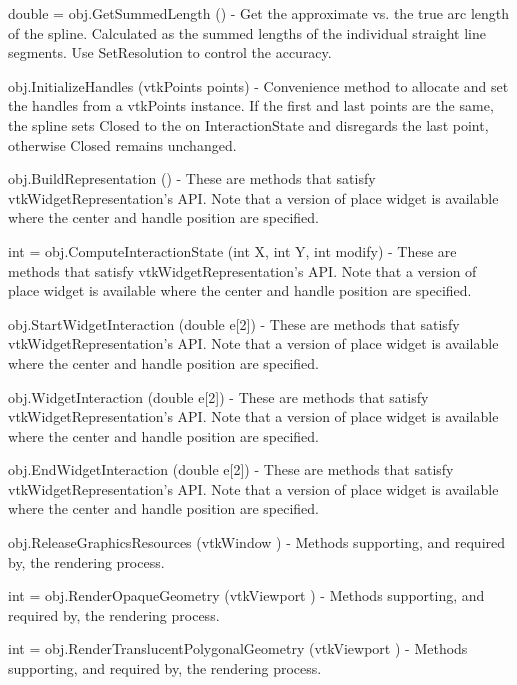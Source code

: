 \begin{DoxyItemize}
\item {\ttfamily double = obj.\-Get\-Summed\-Length ()} -\/ Get the approximate vs. the true arc length of the spline. Calculated as the summed lengths of the individual straight line segments. Use Set\-Resolution to control the accuracy.  
\item {\ttfamily obj.\-Initialize\-Handles (vtk\-Points points)} -\/ Convenience method to allocate and set the handles from a vtk\-Points instance. If the first and last points are the same, the spline sets Closed to the on Interaction\-State and disregards the last point, otherwise Closed remains unchanged.  
\item {\ttfamily obj.\-Build\-Representation ()} -\/ These are methods that satisfy vtk\-Widget\-Representation's A\-P\-I. Note that a version of place widget is available where the center and handle position are specified.  
\item {\ttfamily int = obj.\-Compute\-Interaction\-State (int X, int Y, int modify)} -\/ These are methods that satisfy vtk\-Widget\-Representation's A\-P\-I. Note that a version of place widget is available where the center and handle position are specified.  
\item {\ttfamily obj.\-Start\-Widget\-Interaction (double e\mbox{[}2\mbox{]})} -\/ These are methods that satisfy vtk\-Widget\-Representation's A\-P\-I. Note that a version of place widget is available where the center and handle position are specified.  
\item {\ttfamily obj.\-Widget\-Interaction (double e\mbox{[}2\mbox{]})} -\/ These are methods that satisfy vtk\-Widget\-Representation's A\-P\-I. Note that a version of place widget is available where the center and handle position are specified.  
\item {\ttfamily obj.\-End\-Widget\-Interaction (double e\mbox{[}2\mbox{]})} -\/ These are methods that satisfy vtk\-Widget\-Representation's A\-P\-I. Note that a version of place widget is available where the center and handle position are specified.  
\item {\ttfamily obj.\-Release\-Graphics\-Resources (vtk\-Window )} -\/ Methods supporting, and required by, the rendering process.  
\item {\ttfamily int = obj.\-Render\-Opaque\-Geometry (vtk\-Viewport )} -\/ Methods supporting, and required by, the rendering process.  
\item {\ttfamily int = obj.\-Render\-Translucent\-Polygonal\-Geometry (vtk\-Viewport )} -\/ Methods supporting, and required by, the rendering process.  

\end{DoxyItemize}

